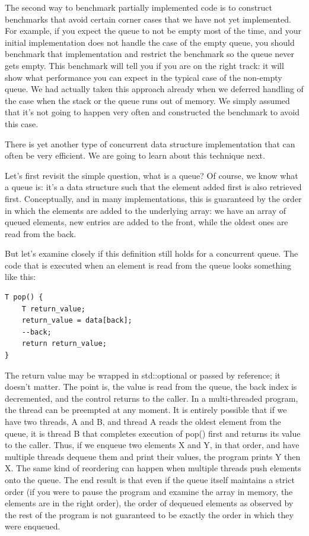 The second way to benchmark partially implemented code is to construct benchmarks that avoid certain corner cases that we have not yet implemented. For example, if you expect the queue to not be empty most of the time, and your initial implementation does not handle the case of the empty queue, you should benchmark that implementation and restrict the benchmark so the queue never gets empty. This benchmark will tell you if you are on the right track: it will show what performance you can expect in the typical case of the non-empty queue. We had actually taken this approach already when we deferred handling of the case when the stack or the queue runs out of memory. We simply assumed that it's not going to happen very often and constructed the benchmark to avoid this case.

There is yet another type of concurrent data structure implementation that can often be very efficient. We are going to learn about this technique next.


Let's first revisit the simple question, what is a queue? Of course, we know what a queue is: it's a data structure such that the element added first is also retrieved first. Conceptually, and in many implementations, this is guaranteed by the order in which the elements are added to the underlying array: we have an array of queued elements, new entries are added to the front, while the oldest ones are read from the back.

But let's examine closely if this definition still holds for a concurrent queue. The code that is executed when an element is read from the queue looks something like this:

\begin{lstlisting}[style=styleCXX]
T pop() {
	T return_value;
	return_value = data[back];
	--back;
	return return_value;
}
\end{lstlisting}

The return value may be wrapped in std::optional or passed by reference; it doesn't matter. The point is, the value is read from the queue, the back index is decremented, and the control returns to the caller. In a multi-threaded program, the thread can be preempted at any moment. It is entirely possible that if we have two threads, A and B, and thread A reads the oldest element from the queue, it is thread B that completes execution of pop() first and returns its value to the caller. Thus, if we enqueue two elements X and Y, in that order, and have multiple threads dequeue them and print their values, the program prints Y then X. The same kind of reordering can happen when multiple threads push elements onto the queue. The end result is that even if the queue itself maintains a strict order (if you were to pause the program and examine the array in memory, the elements are in the right order), the order of dequeued elements as observed by the rest of the program is not guaranteed to be exactly the order in which they were enqueued.


